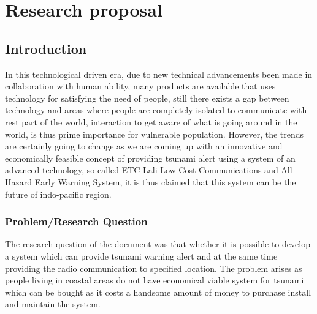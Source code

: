 
\chapter{Research proposal}\label{chapter:firstchapter} %

\label{ChapterX} %


\section{Introduction}\label{sec:firstsection}

\textbf{}
In this technological driven era, due to new technical advancements been made in collaboration with human ability, many products are available that uses technology for satisfying the need of people, still there exists a gap between technology and areas where people are completely isolated to communicate with rest part of the world, interaction to get aware of what is going around in the world, is thus prime importance for vulnerable population. However, the trends are certainly going to change as we are coming up with an innovative and economically feasible concept of providing tsunami alert using a system of an advanced technology, so called ETC-Lali Low-Cost Communications and All-Hazard Early Warning System, it is thus claimed that this system can be the future of indo-pacific region.

\begin{figure}
\begin{centering}


\label{fig:ThisFig}
\end{centering}
\end{figure}

\subsection{Problem/Research Question  }
The research question of the document was that whether it is possible to develop a system which can provide tsunami warning alert and at the same time providing the radio communication to specified location. The problem arises as people living in coastal areas do not have economical viable system for tsunami which can be  bought as it costs a handsome amount of money to purchase install and maintain the system. 
